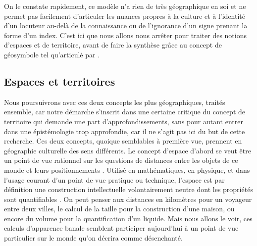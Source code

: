 On le constate rapidement, ce modèle n'a  rien de très géographique en soi et ne permet pas facilement d'articuler les nuances propres à la culture et à l'identité d'un locuteur au-delà de la connaissance ou de l'ignorance d'un signe prenant la forme d'un index. 
C'est ici que nous allons nous arrêter pour traiter des notions d'espaces et de territoire, avant de faire la synthèse grâce au concept de géosymbole tel qu'articulé par \citet{Bonnemaison1981}.


\subsection{Espaces et territoires}
\label{sec:espaces_et_territoires} Nous poursuivrons avec ces deux concepts les plus géographiques, traités ensemble, car notre démarche s'inscrit dans une certaine critique du concept de territoire qui demande une part d'approfondissements,  sans pour autant entrer dans une épistémologie trop approfondie, car il ne s'agit pas ici du but de cette recherche. 
Ces deux concepts, quoique semblables à première vue, prennent en géographie culturelle des sens différents. 
Le concept d'espace d'abord se veut être un point de vue rationnel sur les questions de distances entre les objets de ce monde et leurs positionnements . 
Utilisé en mathématiques, en physique, et dans l'usage courant d'un point de vue pratique ou technique, l'espace est par définition une construction intellectuelle volontairement neutre dont les propriétés sont quantifiables .
On peut penser aux distances en kilomètres pour un voyageur entre deux villes, le calcul de la taille pour la construction d'une maison, ou encore du volume pour la quantification d'un liquide. 
Mais nous allons le voir, ces calculs d'apparence banale semblent participer aujourd'hui à un point de vue particulier sur le monde qu'on décrira comme désenchanté.


